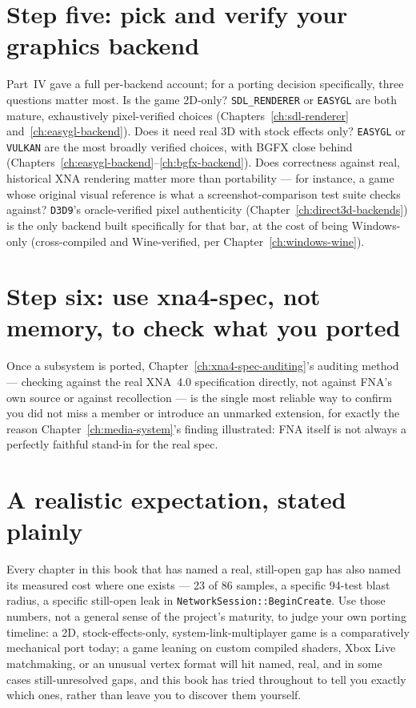 \section{Step five: pick and verify your graphics backend}

Part~IV gave a full per-backend account; for a porting decision specifically,
three questions matter most. Is the game 2D-only? \texttt{SDL\_RENDERER} or \texttt{EASYGL}
are both mature, exhaustively pixel-verified choices (Chapters~\ref{ch:sdl-renderer}
and~\ref{ch:easygl-backend}). Does it need real 3D with stock effects only?
\texttt{EASYGL} or \texttt{VULKAN} are the most broadly verified choices, with BGFX close
behind (Chapters~\ref{ch:easygl-backend}--\ref{ch:bgfx-backend}). Does correctness against
real, historical XNA rendering matter more than portability --- for instance, a game whose
original visual reference is what a screenshot-comparison test suite checks against?
\texttt{D3D9}'s oracle-verified pixel authenticity (Chapter~\ref{ch:direct3d-backends}) is
the only backend built specifically for that bar, at the cost of being Windows-only
(cross-compiled and Wine-verified, per Chapter~\ref{ch:windows-wine}).

\section{Step six: use xna4-spec, not memory, to check what you ported}

Once a subsystem is ported, Chapter~\ref{ch:xna4-spec-auditing}'s auditing method --- checking
against the real XNA~4.0 specification directly, not against FNA's own source or against
recollection --- is the single most reliable way to confirm you did not miss a member or
introduce an unmarked extension, for exactly the reason Chapter~\ref{ch:media-system}'s
 finding illustrated: FNA itself is not always a perfectly faithful stand-in
for the real spec.

\section{A realistic expectation, stated plainly}

Every chapter in this book that has named a real, still-open gap has also named its measured
cost where one exists --- 23 of 86 samples, a specific 94-test blast radius, a specific
still-open leak in \texttt{NetworkSession::BeginCreate}. Use those numbers, not a general
sense of the project's maturity, to judge your own porting timeline: a 2D, stock-effects-only,
system-link-multiplayer game is a comparatively mechanical port today; a game leaning on
custom compiled shaders, Xbox Live matchmaking, or an unusual vertex format will hit named,
real, and in some cases still-unresolved gaps, and this book has tried throughout to tell you
exactly which ones, rather than leave you to discover them yourself.
